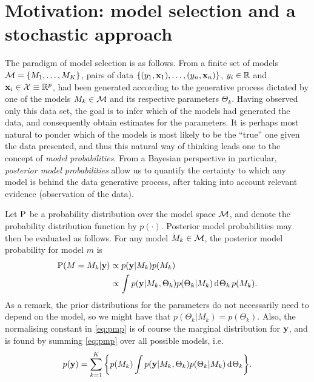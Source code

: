 \documentclass[a4paper,showframe,11pt]{report}
\begin{document}
\newpage
\section{Motivation: model selection and a stochastic approach}\label{sec:bvs-iprior}

The paradigm of model selection is as follows. 
From a finite set of models ${\mathcal M} = \{M_1,\dots,M_K\}$, pairs of data $\{(y_1,{\mathbf x}_1),\dots,(y_n,{\mathbf x}_n)\}$, $y_i\in\mathbb{R}$ and ${\mathbf x}_i\in{\mathcal X}\equiv\mathbb{R}^p$, had been generated according to the generative process dictated by one of the models $M_k \in {\mathcal M}$ and its respective parameters $\Theta_k$.
Having observed only this data set, the goal is to infer which of the models had generated the data, and consequently obtain estimates for the parameters.
It is perhaps most natural to ponder which of the models is most likely to be the ``true'' one given the data presented, and thus this natural way of thinking leads one to the concept of \emph{model probabilities}.
From a Bayesian perspective in particular, \emph{posterior model probabilities} allow us to quantify the certainty to which any model is behind the data generative process, after taking into account relevant evidence (observation of the data).

Let $\operatorname{P}$ be a probability distribution over the model space ${\mathcal M}$, and denote the probability distribution function by $p(\cdot)$.
Posterior model probabilities may then be evaluated as follows. 
For any model $M_k \in {\mathcal M}$, the posterior model probability for model $m$ is
\begin{align}\label{eq:pmp}
  \operatorname{P}(M=M_k|{\mathbf y}) &\propto p({\mathbf y}|M_k)p(M_k) \nonumber \\
  &\propto \int p({\mathbf y}|M_k,\Theta_k)p(\Theta_k|M_k) \operatorname{d}\hspace{0.5pt}\!\Theta_k \, p(M_k).
\end{align}
As a remark, the prior distributions for the parameters do not necessarily need to depend on the model, so we might have that $p(\Theta_k|M_k)=p(\Theta_k)$.
Also, the normalising constant in \cref{eq:pmp} is of course the marginal distribution for ${\mathbf y}$, and is found by summing \cref{eq:pmp} over all possible models, i.e.
\begin{align}\label{eq:normconst}
  p({\mathbf y}) = \sum_{k=1}^K \bigg\{ p(M_k) \int p({\mathbf y}|M_k,\Theta_k)p(\Theta_k|M_k) \operatorname{d}\hspace{0.5pt}\!\Theta_k \bigg\}.
\end{align}
\end{document}
